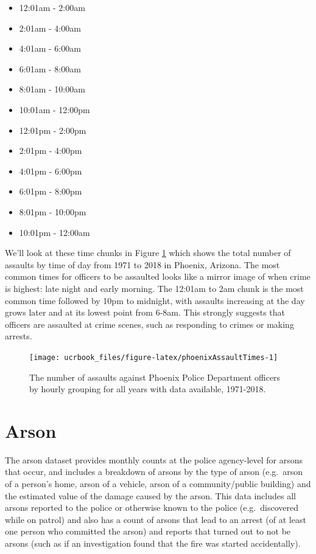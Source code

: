 \documentclass[
  12pt,
  openany]{book}
\providecommand{\tightlist}{%
  \setlength{\itemsep}{0pt}\setlength{\parskip}{0pt}}
\begin{document}
\begin{itemize}
\tightlist
\item
  12:01am - 2:00am
\item
  2:01am - 4:00am
\item
  4:01am - 6:00am
\item
  6:01am - 8:00am
\item
  8:01am - 10:00am
\item
  10:01am - 12:00pm
\item
  12:01pm - 2:00pm
\item
  2:01pm - 4:00pm
\item
  4:01pm - 6:00pm
\item
  6:01pm - 8:00pm
\item
  8:01pm - 10:00pm
\item
  10:01pm - 12:00am
\end{itemize}

We'll look at these time chunks in Figure \ref{fig:phoenixAssaultTimes} which shows the total number of assaults by time of day from 1971 to 2018 in Phoenix, Arizona. The most common times for officers to be assaulted looks like a mirror image of when crime is highest: late night and early morning. The 12:01am to 2am chunk is the most common time followed by 10pm to midnight, with assaults increasing at the day grows later and at its lowest point from 6-8am. This strongly suggests that officers are assaulted at crime scenes, such as responding to crimes or making arrests.

\begin{figure}

{\centering \texttt{[image: ucrbook\_files/figure-latex/phoenixAssaultTimes-1]} 

}

\caption{The number of assaults against Phoenix Police Department officers by hourly grouping for all years with data available, 1971-2018.}\label{fig:phoenixAssaultTimes}
\end{figure}

\hypertarget{arsonChapter}{%
\chapter{Arson}\label{arsonChapter}}

The arson dataset provides monthly counts at the police agency-level for arsons that occur, and includes a breakdown of arsons by the type of arson (e.g.~arson of a person's home, arson of a vehicle, arson of a community/public building) and the estimated value of the damage caused by the arson. This data includes all arsons reported to the police or otherwise known to the police (e.g.~discovered while on patrol) and also has a count of arsons that lead to an arrest (of at least one person who committed the arson) and reports that turned out to not be arsons (such as if an investigation found that the fire was started accidentally).
\end{document}
